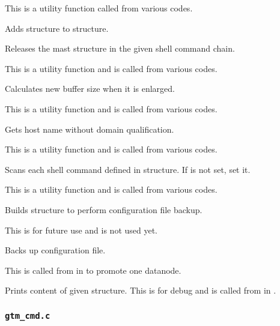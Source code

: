       This is a utility function called from various codes.
  
  
      Adds  structure to  structure.
  
  
      Releases the mast  structure in the given  shell command chain.
      
      This is a utility function and is called from various codes.
  
  
      Calculates new buffer size when it is enlarged.
      
      This is a utility function and is called from various codes.
  
  
      Gets host name without domain qualification.
      
      This is a utility function and is called from various codes.
  
  
      Scans each shell command defined in  structure.
      If  is not set, set it.
      
      This is a utility function and is called from various codes.
  
  
      Builds  structure to perform configuration file backup.
      
      This is for future use and is not used yet.
  
  
      Backs up configuration file.
      
      This is called from  in   to promote one datanode.
  
  
      Prints content of given  structure.
      This is for debug and is called from  in .
  


\subsubsection{\texttt{gtm\_cmd.c}}
  
